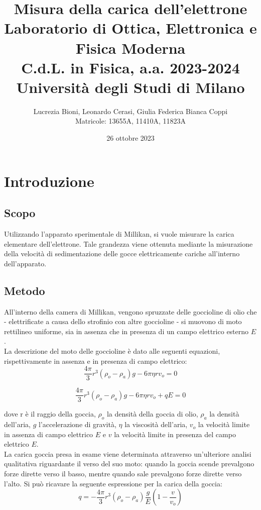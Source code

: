 \documentclass[]{article}
\title{%
    \Huge Misura della carica dell'elettrone \\
    \Large Laboratorio di Ottica, Elettronica e Fisica Moderna \\ C.d.L. in Fisica, a.a. 2023-2024 \\ Università degli Studi di Milano}
\author{\LARGE Lucrezia Bioni, Leonardo Cerasi, Giulia Federica Bianca Coppi \\ Matricole: 13655A, 11410A, 11823A}
\date{26 ottobre 2023}
\let\oldsection\section%
\renewcommand{\section}{%
	\renewcommand{\theequation}{\thesection.\arabic{equation}}%
	\oldsection}%
\let\oldsubsection\subsection%
\renewcommand{\subsection}{%
	\renewcommand{\theequation}{\thesubsection.\arabic{equation}}%
	\oldsubsection}%
\begin{document}
    \maketitle

    \section{Introduzione}
    \subsection{Scopo}
    Utilizzando l'apparato sperimentale di Millikan, si vuole misurare la carica elementare dell'elettrone. Tale grandezza viene ottenuta mediante la misurazione della velocità di sedimentazione delle gocce elettricamente cariche all'interno dell'apparato.

    \subsection{Metodo}
    All'interno della camera di Millikan, vengono spruzzate delle goccioline di olio che - elettrificate a causa dello strofinio con altre goccioline - si muovono di moto rettilineo uniforme, sia in assenza che in presenza di un campo elettrico esterno $E$. \\ La descrizione del moto delle goccioline è dato alle seguenti equazioni, rispettivamente in assenza e in presenza di campo elettrico: 
    \begin{equation}
        \label{moto1}
        \frac{4 \pi}{3} r^3 (\rho_o - \rho_a) g - 6 \pi \eta r v_o = 0
    \end{equation}
        
    \begin{equation}
        \label{moto2}
        \frac{4 \pi}{3} r^3 (\rho_o - \rho_a) g - 6 \pi \eta r v_o + qE= 0
    \end{equation}

    dove r è il raggio della goccia, $\rho_o $ la densità della goccia di olio, $ \rho_a$ la densità dell'aria, $g$ l'accelerazione di gravità, $\eta$ la viscosità dell'aria, $v_o$ la velocità limite in assenza di campo elettrico $E$ e $v$ la velocità limite in presenza del campo elettrico $E$.\\
    La carica goccia presa in esame viene determinata attraverso un'ulteriore analisi qualitativa riguardante il verso del suo moto: quando la goccia scende prevalgono forze dirette verso il basso, mentre quando sale prevalgono forze dirette verso l'alto. Si può ricavare la seguente espressione per la carica della goccia:
    \begin{equation}
        \label{carica-def}
        q= - \frac{4 \pi}{3} r^3 (\rho_o - \rho_a) \frac{g}{E} \left( 1 - \frac{v}{v_o} \right)
    \end{equation}
\end{document}
